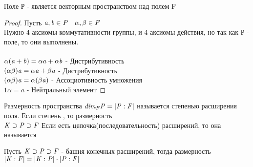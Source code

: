 \begin{defin}
	Поле Р - является векторным пространством над полем F
\end{defin}

\begin{proof}
	Пусть $\mathit{a,b \in P \quad \alpha,\beta\in F}$ \\
	Нужно 4 аксиомы коммутативности группы, и 4 аксиомы действия, но так как Р -
	поле, то они выполнены. \\
	 \\
	$\mathit{\alpha(a+b)=\alpha a + \alpha b}$ - Дистрибутивность \\
	$\mathit{(\alpha \beta)a=\alpha a + \beta a}$ - Дистрибутивность \\
	$\mathit{(\alpha \beta)a=\alpha(\beta a)}$ - Ассоциотивность умножения \\
	$1\alpha=a$ - Нейтральный элемент
\end{proof}

\begin{defin}
	Размерность пространства $\mathit{dim_{F}P = |P:F|}$ называется степенью
	расширения поля. Если степень , то размерность
	 \\
	$\mathit {K \supset P \supset F}$ Если есть цепочка(последовательность)
	расширений, то она называется 
\end{defin}

\begin{theorem}
	Пусть $\mathit {K \supset P \supset F}$ - башня конечных расширений, тогда
	размерность $\mathit {|K:F|=|K:P|\cdot |P:F|}$
\end{theorem}

